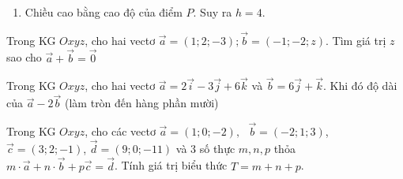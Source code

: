 \begin{ex}
{\begin{enumerate}
			      Suy ra
			      \begin{eqnarray*}
				      \cos \widehat{PFE}&=&\cos \left(\vec{FP},\vec{FE}\right)=\dfrac{\vec{FP}\cdot \vec{FE}}{\left|\vec{FP}\right|\cdot \left|\vec{FE}\right|}\\
				      &=&\dfrac{(-2)\cdot (-4)+0\cdot 0+1\cdot 0}{\sqrt{(-2)^2+0^2+1^2}\cdot \sqrt{(-4)^2+0^2+0^2}}=\dfrac{2\sqrt{5}}{5}.
			      \end{eqnarray*}
			      Do đó, $\widehat{PFE}\approx 26{,}^\circ$. Vậy góc dốc của mái nhà khoảng $26{,}6^\circ$.
			\item Chiều cao bằng cao độ của điểm $P$. Suy ra $h=4$.
		\end{enumerate}
	}
\end{ex} 
\BTTL
\begin{ex}
	Trong KG $Oxyz$, cho hai vectơ $\vec{a}=(1;2;-3);\vec{b}=(-1;-2;z)$. Tìm giá trị $z$ sao cho	$\vec{a}+\vec{b}=\vec{0}$
\end{ex}
\begin{ex}
	Trong KG $Oxyz$, cho hai vectơ $\vec{a}=2\vec{i}-3\vec{j}+6\vec{k}$ và $\vec{b}=6\vec{j}+\vec{k}$. Khi đó độ dài của
	$\vec{a}-2\vec{b}$ (làm tròn đến hàng phần mười)
\end{ex}
\begin{ex}
	Trong KG $Oxyz$, cho các vectơ $\vec{a}=(1;0;-2),\text{ }\vec{b}=(-2;1;3)$,$\vec{c}=(3;2;-1)$, $\vec{d}=(9;0;-11)$ và $3$ số thực $m,n,p$ thỏa $m \cdot \vec{a}+n \cdot \vec{b}+p\vec{c}=\vec{d}$. Tính giá trị biểu thức $T=m+n+p$.
\end{ex}
